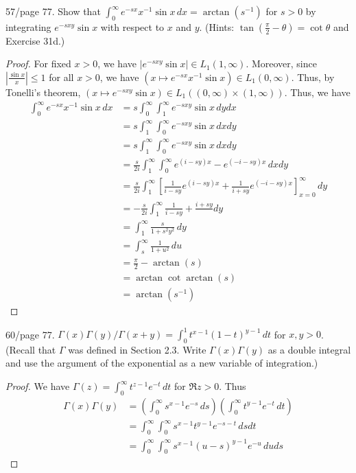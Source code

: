 \documentclass{article}
\begin{document}
 57/page 77. Show that $\int_0^\infty e^{-sx}x^{-1} \sin x \, dx = \arctan(s^{-1})$ for $s > 0$ by integrating $e^{-sxy}\sin x$ with respect to $x$ and $y$.  (Hints: $\tan(\frac \pi 2 - \theta) = \cot \theta$ and Exercise 31d.) %
\begin{proof}
For fixed $x > 0$, we have $\left| e^{-sxy} \sin x \right| \in L_1(1, \infty)$. Moreover, since $\left| \frac {\sin x} x \right| \le 1$ for all $x > 0$, we have $(x \mapsto e^{-sx} x^{-1} \sin x) \in L_1(0,\infty)$. Thus, by Tonelli's theorem, $(x \mapsto e^{-sxy} \sin x) \in L_1((0,\infty) \times (1, \infty))$. Thus, we have
\begin{align*}
\int_0^\infty  e^{-sx} x^{-1} \sin x \, dx & =  s \int_0^\infty \int_1^\infty e^{-sxy} \sin x \, dy dx 
\\ & =  s \int_1^\infty \int_0^\infty e^{-sxy} \sin x \, dx dy
\\ & =  s \int_1^\infty \int_0^\infty e^{-sxy} \sin x \, dx dy
\\ & =  \frac s {2i} \int_1^\infty \int_0^\infty e^{(i-sy)x} - e^{(-i-sy)x} \, dx dy
\\ & =  \frac s {2i} \int_1^\infty \left[\frac 1 {i - sy} e^{(i-sy)x} + \frac 1 {i + sy} e^{(-i-sy)x} \right]_{x = 0}^\infty \,  dy
\\ & =  - \frac s {2i} \int_1^\infty \frac 1 {i - sy} + \frac {i + sy}  \,  dy
\\ & =   \int_1^\infty \frac s {1 + s^2y^2}  \,  dy
\\ & =   \int_{s}^\infty \frac 1 {1 + u^2}  \,  du
\\ & = \frac \pi 2 - \arctan(s) 
\\ & = \arctan \cot \arctan(s) 
\\ & = \arctan (s^{-1}) 
\end{align*}
\end{proof}

 60/page 77. $\Gamma(x) \Gamma(y)/ \Gamma(x + y) = \int_0^1 t^{x-1}(1-t)^{y-1} \, dt$ for $x,y > 0$. (Recall that $\Gamma$ was defined in Section 2.3. Write $\Gamma(x) \Gamma(y)$ as a double integral and use the argument of the exponential as a new variable of integration.)

\begin{proof}
We have $\Gamma(z) = \int_0^\infty t^{z - 1} e^{-t} \, dt$ for $\Re z > 0$.  Thus
\begin{align*}
\Gamma(x) \Gamma(y)  & = \left(\int_0^\infty s^{x - 1} e^{-s} \, ds \right) \left( \int_0^\infty t^{y - 1} e^{-t} \, dt \right)
\\ & = \int_0^ \infty \int_0^\infty s^{x - 1} t^{y-1} e^{-s - t} \, ds dt
\\ & = \int_0^\infty \int_0^\infty s^{x - 1} (u - s)^{y-1} e^{-u} \, du ds
\end{align*}
\end{proof}
\end{document}

